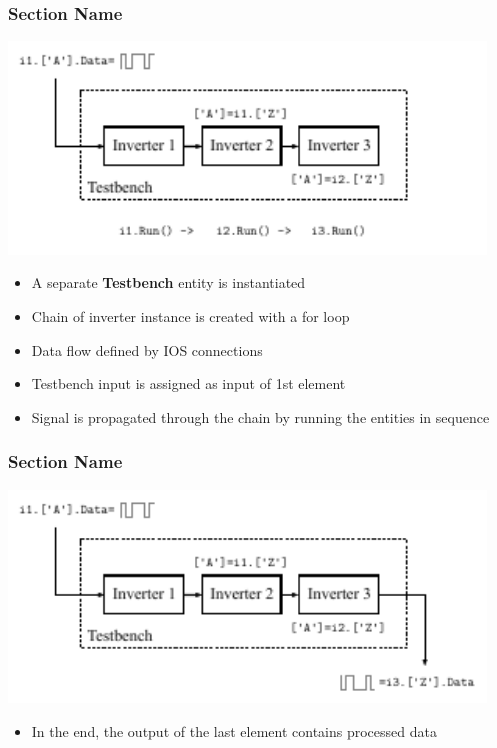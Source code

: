 \documentclass[logo=bluequo,normaltitle]{aaltoslides}
\newcommand{\sectname}{Section Name}
\begin{document}
\begin{frame}[t]
    \frametitle{\sectname}
    \centering
    \includegraphics[width=0.95\textwidth]{Pics/inverter_chain_4}
    \begin{itemize}
        \item A separate \textbf{Testbench} entity is instantiated
        \item Chain of inverter instance is created with a for loop
        \item Data flow defined by IOS connections
        \item Testbench input is assigned as input of 1st element
        \item Signal is propagated through the chain by running the entities
            in sequence
    \end{itemize}
\end{frame}

\begin{frame}[t]
    \frametitle{\sectname}
    \centering
    \includegraphics[width=0.95\textwidth]{Pics/inverter_chain_5}
    \begin{itemize}
        \item In the end, the output of the last element contains processed data
    \end{itemize}
\end{frame}
\end{document}
